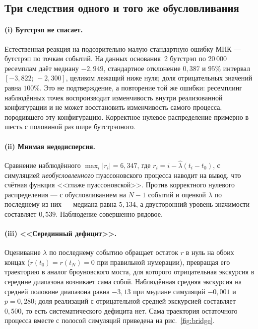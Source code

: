 \documentclass[11pt,a4paper]{article}
\theoremstyle{plain}
\theoremstyle{remark}
\begin{document}
\subsection{Три следствия одного и того же обусловливания}

\paragraph{(i) Бутстрэп не спасает.} Естественная реакция на подозрительно малую
стандартную ошибку МНК --- бутстрэп по точкам событий. На данных основания~2
бутстрэп по $20\,000$ ресемплам даёт медиану $-2{,}949$, стандартное отклонение
$0{,}387$ и $95\%$ интервал $[-3{,}822;\,-2{,}300]$, целиком лежащий ниже нуля; доля отрицательных значений
равна $100\%$. Это не подтверждение, а повторение той же ошибки: ресемплинг наблюдённых
точек воспроизводит изменчивость внутри реализованной конфигурации и не может
восстановить изменчивость самого процесса, породившего эту конфигурацию. Корректное
нулевое распределение примерно в шесть с половиной раз шире бутстрэпного.

\paragraph{(ii) Мнимая недодисперсия.} Сравнение наблюдённого $\max_i|r_i|=6{,}347$,
где $r_i=i-\hat\lambda(t_i-t_0)$, с симуляцией \emph{необусловленного} пуассоновского
процесса наводит на вывод, что счётная функция <<глаже пуассоновской>>. Против
корректного нулевого распределения --- с обусловливанием на $N-1$ событий и оценкой
$\lambda$ по последнему из них --- медиана равна $5{,}134$, а двусторонний уровень
значимости составляет $0{,}539$. Наблюдение совершенно рядовое.

\paragraph{(iii) <<Серединный дефицит>>.} Оценивание $\lambda$ по последнему событию
обращает остаток $r$ в нуль на обоих концах ($r(t_0)=r(t_N)=0$ при правильной
нумерации), превращая его траекторию в аналог броуновского моста, для которого
отрицательная экскурсия в середине диапазона возникает сама собой. Наблюдённая средняя
экскурсия на средней половине диапазона равна $-3{,}13$ при медиане симуляций
$-0{,}001$ и $p=0{,}280$; доля реализаций с отрицательной средней экскурсией
составляет $0{,}500$, то есть систематического дефицита нет. Сама траектория
остаточного процесса вместе с полосой симуляций приведена на
рис.~\ref{fig:bridge}.
\end{document}
